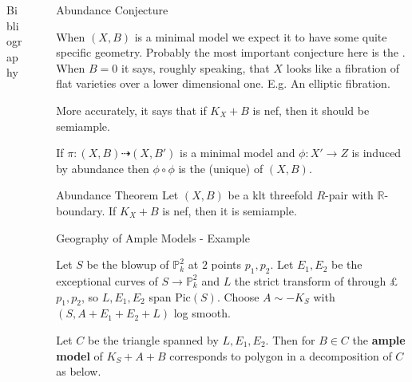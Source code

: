 \documentclass[final]{beamer}
\newlength{\sepwidth}
\newcommand{\separatorcolumn}{\begin{column}{\sepwidth}\end{column}}
\begin{document}
\begin{frame}[t, fragile]
\begin{columns}[t]
\begin{column}{0.15\paperwidth}
			
			\begin{block}{Bibliography}
				\printbibliography
			\end{block}
			
		\end{column}
		
		\separatorcolumn
		
		\begin{column}{0.39\paperwidth}
			
			\begin{block}{Abundance Conjecture}
				
				When $(X,B)$ is a minimal model we expect it to have some quite specific geometry. Probably the most important conjecture here is the . When $B=0$ it says, roughly speaking, that $X$ looks like a fibration of flat varieties over a lower dimensional one. E.g. An elliptic fibration. 
				
				More accurately, it says that if $K_X+B$ is nef, then it should be semiample.
				
				If $\pi:(X,B) \dashrightarrow (X,B')$ is a minimal model and $\phi: X' \to Z$ is induced by abundance then $\phi \circ \phi $ is the (unique)  of $(X,B)$.
			\end{block}  
			
			\begin{alertblock}{Abundance Theorem}
				Let $(X,B)$ be a klt threefold $R$-pair with $\mathbb{R}$-boundary. If $K_X+B$ is nef, then it is semiample.
			\end{alertblock}  
			
			\begin{block}{Geography of Ample Models - Example}
				
				Let $S$ be the blowup of $\mathbb{P}^{2}_{k}$ at $2$ points $p_{1},p_{2}$. Let $E_{1},E_{2}$ be the exceptional curves of $S \to \mathbb{P}^{2}_{k}$ and $L$ the strict transform of through £$p_{1}, p_{2}$, so $L,E_{1},E_{2}$ span $\text{Pic}(S)$. Choose $A \sim -K_{S}$ with $(S,A+E_{1}+E_{2}+L)$ log smooth. 
				
				Let $C$ be the triangle spanned by $L,E_{1},E_{2}$. Then for $B \in C$ the \textbf{ample model} of $K_{S}+A+B$ corresponds to polygon in a decomposition of $C$ as below.
				
				\begin{center}
					
					\begin{tikzpicture}[x=0.75pt,y=0.75pt,yscale=-2,xscale=2]
					

\end{tikzpicture}
\end{center}
\end{block}
\end{column}
\end{columns}
\end{frame}
\end{document}

